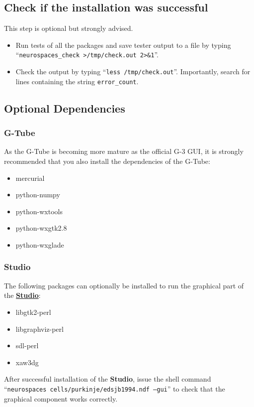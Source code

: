 \documentclass[12pt]{article}
\begin{document}
\subsection*{Check if the installation was successful}

This step is optional but strongly advised.

\begin{itemize}      
   \item[] Run tests of all the packages and save tester output to a file  by typing ``{\tt neurospaces\_check >/tmp/check.out 2>\&1}''.
   \item[] Check the output by typing ``{\tt less /tmp/check.out}''. Importantly, search for lines containing the string {\tt error\_count}.
\end{itemize}
    

\subsection*{Optional Dependencies}

\subsubsection*{G-Tube}

As the G-Tube is becoming more mature as the official G-3 GUI, it is
strongly recommended that you also install the dependencies of the G-Tube:

\begin{itemize}
\item mercurial
\item python-numpy
\item python-wxtools
\item python-wxgtk2.8
\item python-wxglade
\end{itemize}

\subsubsection*{Studio}

The following packages can optionally be installed to run the
graphical part of the \href{../studio/studio.tex}{\bf Studio}:
\begin{itemize}
\item libgtk2-perl
\item libgraphviz-perl
\item sdl-perl
\item xaw3dg
\end{itemize}
After successful installation of the {\bf Studio}, issue the
shell command ``{\tt neurospaces cells/purkinje/edsjb1994.ndf --gui}'' to check that 
the graphical component works correctly.
\end{document}
